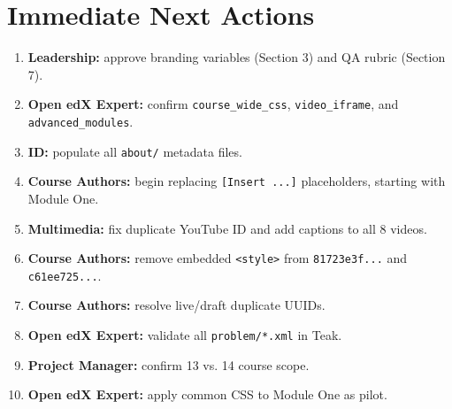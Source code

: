 \chapter{Immediate Next Actions}

\begin{enumerate}
  \item \textbf{Leadership:} approve branding variables (Section 3) and QA rubric (Section 7).
  \item \textbf{Open edX Expert:} confirm \texttt{course\_wide\_css}, \texttt{video\_iframe}, and \texttt{advanced\_modules}.
  \item \textbf{ID:} populate all \texttt{about/} metadata files.
  \item \textbf{Course Authors:} begin replacing \texttt{[Insert ...]} placeholders, starting with Module One.
  \item \textbf{Multimedia:} fix duplicate YouTube ID and add captions to all 8 videos.
  \item \textbf{Course Authors:} remove embedded \texttt{<style>} from \texttt{81723e3f...} and \texttt{c61ee725...}.
  \item \textbf{Course Authors:} resolve live/draft duplicate UUIDs.
  \item \textbf{Open edX Expert:} validate all \texttt{problem/*.xml} in Teak.
  \item \textbf{Project Manager:} confirm 13 vs. 14 course scope.
  \item \textbf{Open edX Expert:} apply common CSS to Module One as pilot.
\end{enumerate}